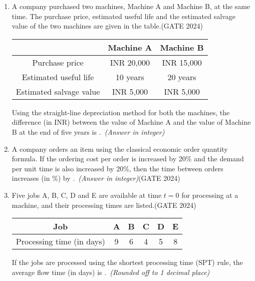 \documentclass[journal,12pt,onecolumn]{IEEEtran}
\theoremstyle{remark}
\begin{document}
\begin{enumerate}
\item A company purchased two machines, Machine A and Machine B, at the same time. The purchase price, estimated useful life and the estimated salvage value of the two machines are given in the table.\hfill{(GATE 2024)}
\begin{center}
\begin{tabular}{|c|c|c|}
\hline
 & Machine A & Machine B \\
\hline
Purchase price & INR 20,000 & INR 15,000 \\
\hline
Estimated useful life & 10 years & 20 years \\
\hline
Estimated salvage value & INR 5,000 & INR 5,000 \\
\hline
\end{tabular}
\end{center}
Using the straight-line depreciation method for both the machines, the difference (in INR) between the value of Machine A and the value of Machine B at the end of five years is \underline{\hspace{2cm}}.\ \textit{(Answer in integer)}
\vspace{1cm}

\item A company orders an item using the classical economic order quantity formula. If the ordering cost per order is increased by 20\% and the demand per unit time is also increased by 20\%, then the time between orders increases (in \%) by \underline{\hspace{2cm}}.\ \textit{(Answer in integer)}\hfill{(GATE 2024)}
\vspace{1cm}

\item Five jobs A, B, C, D and E are available at time $t = 0$ for processing at a machine, and their processing times are listed.\hfill{(GATE 2024)}
\begin{center}
\begin{tabular}{|c|c|c|c|c|c|}
\hline
Job & A & B & C & D & E \\
\hline
Processing time (in days) & 9 & 6 & 4 & 5 & 8 \\
\hline
\end{tabular}
\end{center}
If the jobs are processed using the shortest processing time (SPT) rule, the average flow time (in days) is \underline{\hspace{2cm}}.\ \textit{(Rounded off to 1 decimal place)}
\vspace{1cm}












    
\end{enumerate}
\end{document}
